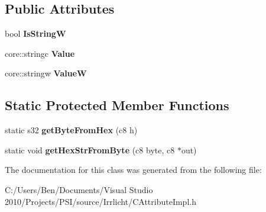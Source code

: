 \subsection*{Public Attributes}
\begin{DoxyCompactItemize}
\item 
\hypertarget{classirr_1_1io_1_1_c_string_attribute_ace6cf396dc64ac26e67f861f1f58de61}{bool {\bfseries Is\-String\-W}}\label{classirr_1_1io_1_1_c_string_attribute_ace6cf396dc64ac26e67f861f1f58de61}

\item 
\hypertarget{classirr_1_1io_1_1_c_string_attribute_ac7dbd9c5babf59c8425e1aa1698d8dcb}{core\-::stringc {\bfseries Value}}\label{classirr_1_1io_1_1_c_string_attribute_ac7dbd9c5babf59c8425e1aa1698d8dcb}

\item 
\hypertarget{classirr_1_1io_1_1_c_string_attribute_a44f59dd6b136b091bb47ac61e9cba952}{core\-::stringw {\bfseries Value\-W}}\label{classirr_1_1io_1_1_c_string_attribute_a44f59dd6b136b091bb47ac61e9cba952}

\end{DoxyCompactItemize}
\subsection*{Static Protected Member Functions}
\begin{DoxyCompactItemize}
\item 
\hypertarget{classirr_1_1io_1_1_c_string_attribute_aaebf0fddf5f696a60719c5d136b9bb5b}{static s32 {\bfseries get\-Byte\-From\-Hex} (c8 h)}\label{classirr_1_1io_1_1_c_string_attribute_aaebf0fddf5f696a60719c5d136b9bb5b}

\item 
\hypertarget{classirr_1_1io_1_1_c_string_attribute_a3e62c30d149b1cf56768be04ac88da04}{static void {\bfseries get\-Hex\-Str\-From\-Byte} (c8 byte, c8 $\ast$out)}\label{classirr_1_1io_1_1_c_string_attribute_a3e62c30d149b1cf56768be04ac88da04}

\end{DoxyCompactItemize}


The documentation for this class was generated from the following file\-:\begin{DoxyCompactItemize}
\item 
C\-:/\-Users/\-Ben/\-Documents/\-Visual Studio 2010/\-Projects/\-P\-S\-I/source/\-Irrlicht/C\-Attribute\-Impl.\-h\end{DoxyCompactItemize}

